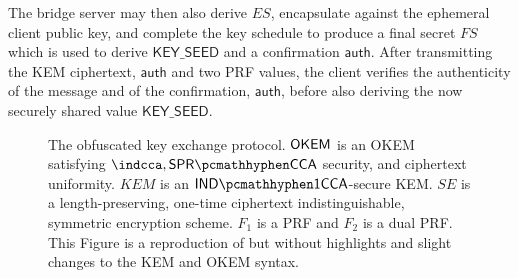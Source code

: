 The bridge server may then also derive $ES$, encapsulate against the ephemeral client public key, and complete the key schedule to produce a final secret $FS$ which is used to derive $\mathsf{KEY\_SEED}$ and a confirmation $\mathsf{auth}$.
After transmitting the KEM ciphertext, $\mathsf{auth}$ and two PRF values, the client verifies the authenticity of the message and of the confirmation, $\mathsf{auth}$, before also deriving the now securely shared value $\mathsf{KEY\_SEED}$.

\begin{figure}
    
    \caption[
        The \drivel{} obfuscated key exchange protocol.
    ]{
        The \drivel{} obfuscated key exchange protocol.
        $\mathsf{OKEM}$ is an OKEM satisfying $\indcca, \sprcca$ security, and ciphertext uniformity.
        $KEM$ is an $\indonecca$-secure KEM.
        $SE$ is a length-preserving, one-time ciphertext indistinguishable, symmetric encryption scheme.
        $F_1$ is a PRF and $F_2$ is a dual PRF.
        This Figure is a reproduction of \cite[Fig.~6]{EPRINT:GRSV25} but without highlights and slight changes to the KEM and OKEM syntax.
    }
    \label{fig:drivel}
\end{figure}